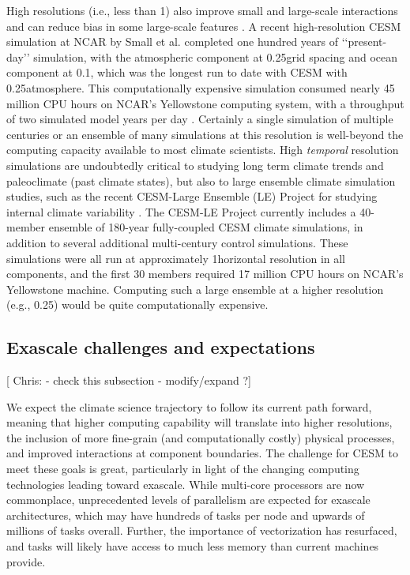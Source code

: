  High resolutions (i.e., less than 1\degree)  also improve small and large-scale interactions and can reduce bias in some large-scale features \cite{small2014}.  A recent high-resolution CESM simulation at NCAR by Small et al. \cite{small2014} completed one hundred years of ‘‘present-day’’ simulation, with the atmospheric component at 0.25\degree grid spacing and ocean component at 0.1\degree, which was the longest run to date with CESM with 0.25\degree atmosphere.  This computationally expensive simulation consumed nearly 45 million CPU hours on NCAR's Yellowstone computing system, with a throughput of two simulated model years per day \cite{small2014}. Certainly a single simulation of multiple centuries or an ensemble of many simulations at this resolution is well-beyond the computing capacity available to most climate scientists.  High \textit{temporal} resolution simulations are undoubtedly critical to studying long term climate trends and paleoclimate (past climate states), but also to large ensemble climate simulation studies, such as the recent CESM-Large Ensemble (LE) Project for studying internal climate variability \citep{kay2015}.  The CESM-LE Project currently includes a 40-member ensemble of 180-year fully-coupled CESM climate simulations, in addition to several additional multi-century control simulations.  These simulations were all run at approximately 1\degree horizontal resolution in all components, and the first 30 members required 17 million CPU hours on NCAR's Yellowstone machine.  Computing such a large ensemble at a higher resolution (e.g., 0.25\degree) would be quite computationally expensive.


\subsection{Exascale challenges and expectations}
[{\color{red} Chris:} - check this subsection - modify/expand ?]

We expect the climate science trajectory to follow its current path forward, meaning that higher computing capability will translate into higher resolutions, the inclusion of more fine-grain (and computationally costly) physical processes, and improved interactions at component boundaries. The challenge for CESM to meet these goals is great, particularly in light of the changing computing technologies leading toward exascale.  While multi-core processors are now commonplace, unprecedented levels of parallelism are expected for exascale architectures, which may have hundreds of tasks per node and upwards of millions of tasks overall.  Further, the importance of vectorization has resurfaced, and tasks will likely have access to much less memory than current machines provide.

